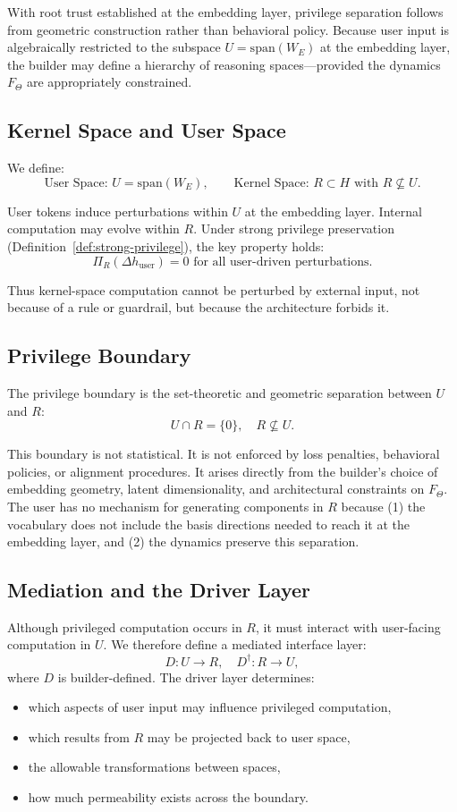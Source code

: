 \documentclass[11pt,a4paper]{article}
\begin{document}
With root trust established at the embedding layer, privilege separation follows from geometric construction rather than behavioral policy. Because user input is algebraically restricted to the subspace $U = \text{span}(W_E)$ at the embedding layer, the builder may define a hierarchy of reasoning spaces---provided the dynamics $F_\Theta$ are appropriately constrained.

\subsection{Kernel Space and User Space}

We define:
\[
\text{User Space: } U = \text{span}(W_E), \qquad \text{Kernel Space: } R \subset H \text{ with } R \not\subseteq U.
\]

User tokens induce perturbations within $U$ at the embedding layer. Internal computation may evolve within $R$. Under strong privilege preservation (Definition~\ref{def:strong-privilege}), the key property holds:
\[
\Pi_R(\Delta h_{\text{user}}) = 0 \text{ for all user-driven perturbations.}
\]

Thus kernel-space computation cannot be perturbed by external input, not because of a rule or guardrail, but because the architecture forbids it.

\subsection{Privilege Boundary}

The privilege boundary is the set-theoretic and geometric separation between $U$ and $R$:
\[
U \cap R = \{0\}, \quad R \not\subseteq U.
\]

This boundary is not statistical. It is not enforced by loss penalties, behavioral policies, or alignment procedures. It arises directly from the builder's choice of embedding geometry, latent dimensionality, and architectural constraints on $F_\Theta$. The user has no mechanism for generating components in $R$ because (1) the vocabulary does not include the basis directions needed to reach it at the embedding layer, and (2) the dynamics preserve this separation.

\subsection{Mediation and the Driver Layer}

Although privileged computation occurs in $R$, it must interact with user-facing computation in $U$. We therefore define a mediated interface layer:
\[
D: U \to R, \quad D^\dagger: R \to U,
\]
where $D$ is builder-defined. The driver layer determines:
\begin{itemize}
    \item which aspects of user input may influence privileged computation,
    \item which results from $R$ may be projected back to user space,
    \item the allowable transformations between spaces,
    \item how much permeability exists across the boundary.
\end{itemize}
\end{document}
